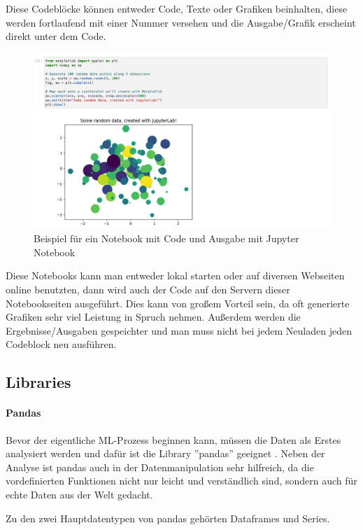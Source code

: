 Diese Codeblöcke können entweder Code, Texte oder Grafiken beinhalten, diese werden fortlaufend mit einer Nummer versehen und die Ausgabe/Grafik erscheint direkt unter dem Code.

\begin{figure}[H]
    \centering
    \includegraphics[scale=0.4]{sections/machine-learning/images/jupyter-notebook.png}
    \caption{Beispiel für ein Notebook mit Code und Ausgabe mit Jupyter Notebook}
\end{figure}

Diese Notebooks kann man entweder lokal starten oder auf diversen Webseiten online benutzten, dann wird auch der Code auf den Servern dieser Notebookseiten ausgeführt. Dies kann von großem Vorteil sein, da oft generierte Grafiken sehr viel Leistung in Spruch nehmen. Außerdem werden die Ergebnisse/Ausgaben gespeichter und man muss nicht bei jedem Neuladen jeden Codeblock neu ausführen.

\subsection{Libraries}

\paragraph{Pandas}

Bevor der eigentliche ML-Prozess beginnen kann, müssen die Daten als Erstes analysiert werden und dafür ist die Library ''pandas'' geeignet . Neben der Analyse ist pandas auch in der Datenmanipulation sehr hilfreich, da die vordefinierten Funktionen nicht nur leicht und verständlich sind, sondern auch für echte Daten aus der Welt gedacht.

Zu den zwei Hauptdatentypen von pandas gehörten Dataframes und Series.

